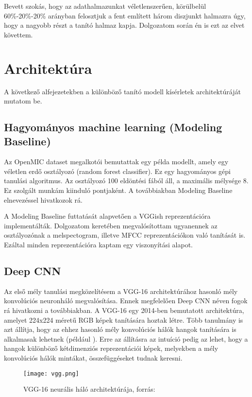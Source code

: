 Bevett szokás, hogy az adathalmazunkat véletlenszerűen, körülbelül 60\%-20\%-20\% arányban felosztjuk a fent említett három diszjunkt halmazra úgy, hogy a nagyobb részt a tanító halmaz kapja. \cite{traintestvalid} Dolgozatom során én is ezt az elvet követtem.

\section{Architektúra}

A következő alfejezetekben a különböző tanító modell kísérletek architektúráját mutatom be.

\subsection{Hagyományos machine learning (Modeling Baseline)}

Az OpenMIC dataset megalkotói bemutattak egy példa modellt, amely egy véletlen erdő osztályozó (random forest classifier). \cite{humphrey2018openmic} Ez egy hagyományos gépi tanulási algoritmus. Az osztályozó 100 eldöntési fából áll, a maximális mélysége 8. Ez szolgált munkám kiinduló pontjaként. A továbbiakban Modeling Baseline elnevezéssel hivatkozok rá.

A Modeling Baseline futtatását alapvetően a VGGish reprezentációra implementálták. Dolgozatom keretében megvalósítottam ugyanennek az osztályozónak a melspectogram, illetve MFCC reprezentációkon való tanítását is. Ezáltal minden reprezentációra kaptam egy viszonyítási alapot.

\subsection{Deep CNN}

Az első mély tanulási megközelítésem a VGG-16 \cite{vgg} architektúrához hasonló mély konvolúciós neuronháló megvalósítása. Ennek megfelelően Deep CNN néven fogok rá hivatkozni a továbbiakban. A VGG-16 egy 2014-ben bemutatott architektúra, amelyet 224x224 méretű RGB képek tanítására hoztak létre. Több tanulmány is azt állítja, hogy az ehhez hasonló mély konvolúciós hálók hangok tanítására is alkalmasak lehetnek (például \cite{choi2017tutorial}). Erre az állításra az intuíció pedig az lehet, hogy a hangok különböző kétdimenziós reprezentációi képek, melyekben a mély konvolúciós hálók mintákat, összefüggéseket tudnak keresni.

\begin{figure}[H]
  \centering
  \texttt{[image: vgg.png]}
  \caption{VGG-16 neurális háló architektúrája, forrás: \cite{loukadakis2018}}
\end{figure}

